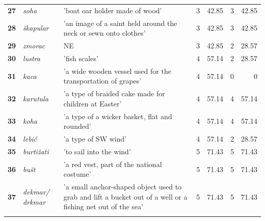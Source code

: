 \documentclass[output=paper]{LSP/langsci}
\begin{document}
\begin{table}
{\begin{tabular}{lp{2cm}p{5cm}lrlr}
{\bfseries 27} & {\itshape soha} & 'boat oar holder made of wood' & 3 & 42.85 & 3 & 42.85\\

{\bfseries 28} & {\itshape škapular} & 'an image of a saint held around the neck or sewn onto clothes' & 3 & 42.85 & 3 & 42.85\\

{\bfseries 29} & {\itshape zmorac} & NE & 3 & 42.85 & 2 & 28.57\\

{\bfseries 30} & {\itshape lustra} & 'fish scales' & 4 & 57.14 & 2 & 28.57\\

{\bfseries 31} & {\itshape kaca} & 'a wide wooden vessel used for the transportation of grapes' & 4 & 57.14 & 0 & 0\\

{\bfseries 32} & {\itshape karutula} & 'a type of braided cake made for children at Easter' & 4 & 57.14 & 4 & 57.14\\

{\bfseries 33} & {\itshape koha} & 'a type of a wicker basket, flat and rounded' & 4 & 57.14 & 4 & 57.14\\

{\bfseries 34} & {\itshape lebić} & 'a type of SW wind' & 4 & 57.14 & 2 & 28.57\\

{\bfseries 35} & {\itshape burtižati} & 'to sail into the wind' & 5 & 71.43 & 5 & 71.43\\

{\bfseries 36} & {\itshape bušt} & 'a red vest, part of the national costume' & 5 & 71.43 & 5 & 71.43\\

{\bfseries 37} & {\itshape dekmar/ \mbox{drkmar}} & 'a small anchor-shaped object used to grab and lift a bucket out of a well or a fishing net out of the sea' & 5 & 71.43 & 5 & 71.43\\

\lspbottomrule
\end{tabular}
}
\end{table}
\end{document}

